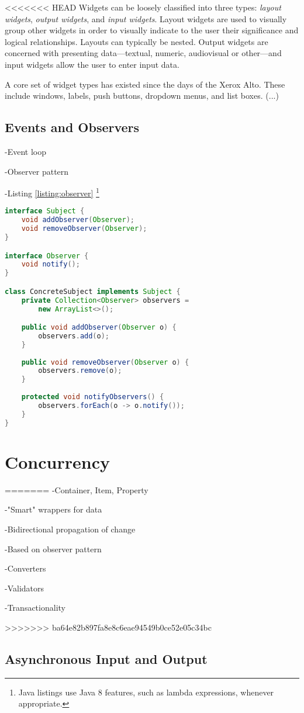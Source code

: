 <<<<<<< HEAD
Widgets can be loosely classified into three types: \emph{layout widgets}, \emph{output widgets}, and \emph{input widgets}. Layout widgets are used to visually group other widgets in order to visually indicate to the user their significance and logical relationships. Layouts can typically be nested. Output widgets are concerned with presenting data---textual, numeric, audiovisual or other---and input widgets allow the user to enter input data.

A core set of widget types has existed since the days of the Xerox Alto. These include windows, labels, push buttons, dropdown menus, and list boxes. (...)

\subsection{Events and Observers}

-Event loop

-Observer pattern \cite{GoF}

-Listing \ref{listing:observer} \footnote{Java listings use Java 8 features, such as lambda expressions, whenever appropriate.}

\begin{code}
\begin{lstlisting}[language=Java,caption=An implementation of the observer pattern in Java 8.\label{listing:observer}]
interface Subject {
    void addObserver(Observer);
    void removeObserver(Observer);
}

interface Observer {
    void notify();
}

class ConcreteSubject implements Subject {
    private Collection<Observer> observers = 
        new ArrayList<>();

    public void addObserver(Observer o) {
        observers.add(o);
    }
    
    public void removeObserver(Observer o) {
        observers.remove(o);
    }
    
    protected void notifyObservers() {
        observers.forEach(o -> o.notify());
    }
}
\end{lstlisting}
\end{code}

\section{Concurrency}
=======
-Container, Item, Property

-"Smart" wrappers for data

-Bidirectional propagation of change

-Based on observer pattern

-Converters

-Validators

-Transactionality

>>>>>>> ba64e82b897fa8e8c6eae94549b0ce52e05c34bc

\subsection{Asynchronous Input and Output}
